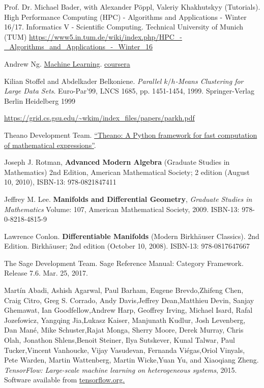 \documentclass[10pt]{amsart}
\begin{document}
\begin{thebibliography}{9}
Prof. Dr. Michael Bader, with Alexander P\"{o}ppl, Valeriy Khakhutskyy (Tutorials).  High Performance Computing (HPC) - Algorithms and Applications - Winter 16/17.  Informatics V - Scientific Computing.  Technical University of Munich (TUM)
\url{https://www5.in.tum.de/wiki/index.php/HPC_-_Algorithms_and_Applications_-_Winter_16}


Andrew Ng.  \href{https://www.coursera.org/learn/machine-learning/home/welcome}{Machine Learning}.  \href{https://www.coursera.org}{coursera}


Kilian Stoffel and Abdelkader Belkoniene.  \emph{Parallel $k/h$-Means Clustering for Large Data Sets}.  Euro-Par'99, LNCS 1685, pp. 1451-1454, 1999.  Springer-Verlag Berlin Heidelberg 1999

\url{https://grid.cs.gsu.edu/~wkim/index_files/papers/parkh.pdf}

Theano Development Team. \href{http://arxiv.org/pdf/1605.02688.pdf}{“Theano: A Python framework for fast computation of mathematical expressions”}. 

Joseph J. Rotman, \textbf{Advanced Modern Algebra} (Graduate Studies in Mathematics) 2nd Edition, American Mathematical Society; 2 edition (August 10, 2010), ISBN-13: 978-0821847411

Jeffrey M. Lee. \textbf{Manifolds and Differential Geometry}, \emph{Graduate Studies in Mathematics} Volume: 107, American Mathematical Society, 2009. ISBN-13: 978-0-8218-4815-9

Lawrence Conlon.  \textbf{Differentiable Manifolds} (Modern Birkhäuser Classics).  2nd Edition.  Birkhäuser; 2nd edition (October 10, 2008).  ISBN-13: 978-0817647667

The Sage Development Team.  Sage Reference Manual: Category Framework.  Release 7.6.  Mar. 25, 2017.  

Martín Abadi, Ashish Agarwal, Paul Barham, Eugene Brevdo,Zhifeng Chen, Craig Citro, Greg S. Corrado, Andy Davis,Jeffrey Dean,Matthieu Devin, Sanjay Ghemawat, Ian Goodfellow,Andrew Harp, Geoffrey Irving, Michael Isard, Rafal Jozefowicz, Yangqing Jia,Lukasz Kaiser, Manjunath Kudlur, Josh Levenberg, Dan Mané, Mike Schuster,Rajat Monga, Sherry Moore, Derek Murray, Chris Olah, Jonathon Shlens,Benoit Steiner, Ilya Sutskever, Kunal Talwar, Paul Tucker,Vincent Vanhoucke, Vijay Vasudevan, Fernanda Viégas,Oriol Vinyals, Pete Warden, Martin Wattenberg, Martin Wicke,Yuan Yu, and Xiaoqiang Zheng.  
\emph{TensorFlow: Large-scale machine learning on heterogeneous systems}, 2015. Software available from \href{http://tensorflow.org/}{tensorflow.org.}


\end{thebibliography}
\end{document}
